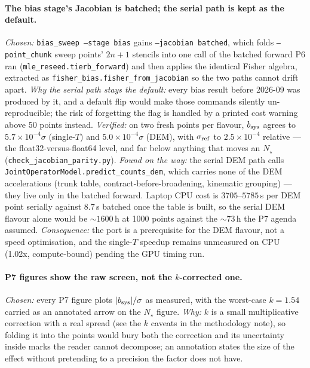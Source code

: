 \documentclass[11pt]{article}
\begin{document}
\paragraph{The bias stage's Jacobian is batched; the serial path is kept as
the default.} \emph{Chosen:} \texttt{bias\_sweep --stage bias} gains
\texttt{--jacobian batched}, which folds \texttt{--point\_chunk} sweep points'
$2n+1$ stencils into one call of the batched forward P6 ran
(\texttt{mle\_reseed.tierb\_forward}) and then applies the identical Fisher
algebra, extracted as \texttt{fisher\_bias.fisher\_from\_jacobian} so the two
paths cannot drift apart. \emph{Why the serial path stays the default:} every
bias result before 2026-09 was produced by it, and a default flip would make
those commands silently un-reproducible; the risk of forgetting the flag is
handled by a printed cost warning above 50 points instead. \emph{Verified:} on
two fresh points per flavour, $b_{\rm sys}$ agrees to $5.7\times10^{-4}\sigma$
(single-$T$) and $5.0\times10^{-4}\sigma$ (DEM), with $\sigma_{\rm ref}$ to
$2.5\times10^{-4}$ relative --- the float32-versus-float64 level, and far below
anything that moves an $N_\star$ (\texttt{check\_jacobian\_parity.py}).
\emph{Found on the way:} the serial DEM path calls
\texttt{JointOperatorModel.predict\_counts\_dem}, which carries none of the DEM
accelerations (trunk table, contract-before-broadening, kinematic grouping) ---
they live only in the batched forward. Laptop CPU cost is $3705$--$5785$\,s per
DEM point serially against $8.7$\,s batched once the table is built, so the
serial DEM flavour alone would be ${\sim}1600$\,h at 1000 points against the
${\sim}73$\,h the P7 agenda assumed. \emph{Consequence:} the port is a
prerequisite for the DEM flavour, not a speed optimisation, and the single-$T$
speedup remains unmeasured on CPU (1.02x, compute-bound) pending the GPU
timing run.


\paragraph{P7 figures show the raw screen, not the $k$-corrected one.}
\emph{Chosen:} every P7 figure plots $|b_{\rm sys}|/\sigma$ as measured, with
the worst-case $k=1.54$ carried as an annotated arrow on the $N_\star$ figure.
\emph{Why:} $k$ is a small multiplicative correction with a real spread
(see the $k$ caveats in the methodology note), so folding it into the points would bury both the
correction and its uncertainty inside marks the reader cannot decompose; an
annotation states the size of the effect without pretending to a precision the
factor does not have.
\end{document}
